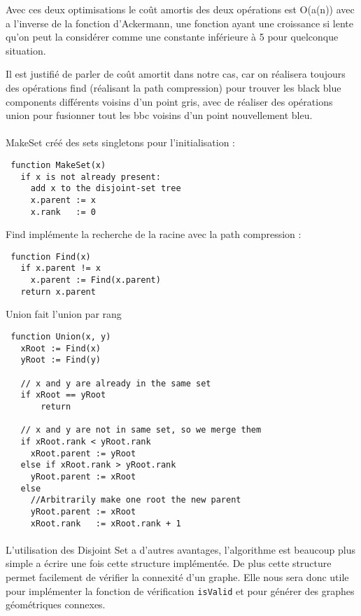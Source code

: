 Avec ces deux optimisations le coût amortis des deux opérations est O(a(n)) avec a l'inverse de la fonction d'Ackermann, une fonction ayant une croissance si lente qu'on peut la considérer comme une constante inférieure à 5 pour quelconque situation.

Il est justifié de parler de coût amortit dans notre cas, car on réalisera toujours des opérations find (réalisant la path compression) pour trouver les black blue components différents voisins d'un point gris, avec de réaliser des opérations union pour fusionner tout les bbc voisins d'un point nouvellement bleu.

\paragraph{}
MakeSet créé des sets singletons pour l'initialisation :
\begin{lstlisting}
 function MakeSet(x)
   if x is not already present:
     add x to the disjoint-set tree
     x.parent := x
     x.rank   := 0
\end{lstlisting}

Find implémente la recherche de la racine avec la path compression :
\begin{lstlisting}
 function Find(x)
   if x.parent != x
     x.parent := Find(x.parent)
   return x.parent
\end{lstlisting}

Union fait l'union par rang
\begin{lstlisting}
 function Union(x, y)
   xRoot := Find(x)
   yRoot := Find(y)
 
   // x and y are already in the same set
   if xRoot == yRoot            
       return
   
   // x and y are not in same set, so we merge them
   if xRoot.rank < yRoot.rank
     xRoot.parent := yRoot
   else if xRoot.rank > yRoot.rank
     yRoot.parent := xRoot
   else
     //Arbitrarily make one root the new parent
     yRoot.parent := xRoot    
     xRoot.rank   := xRoot.rank + 1
\end{lstlisting}

\paragraph{}
L'utilisation des Disjoint Set a d'autres avantages, l'algorithme est beaucoup plus simple a écrire une fois cette structure implémentée. De plus cette structure permet facilement de vérifier la connexité d'un graphe. Elle nous sera donc utile pour implémenter la fonction de vérification \verb?isValid? et pour générer des graphes géométriques connexes.

